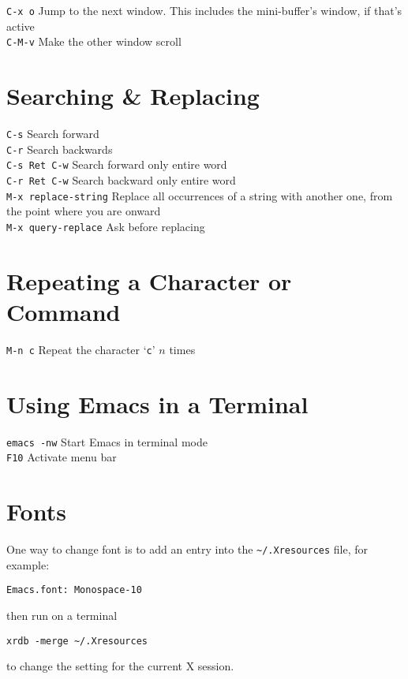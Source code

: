 \documentclass[a4paper,12pt]{report}
\begin{document}
\texttt{C-x o} Jump to the next window. This includes the mini-buffer's window, if that's active \\

\texttt{C-M-v} Make the other window scroll \\
\section{Searching \& Replacing}

\texttt{C-s} Search forward \\

\texttt{C-r} Search backwards \\

\texttt{C-s Ret C-w} Search forward only entire word \\

\texttt{C-r Ret C-w} Search backward only entire word \\

\texttt{M-x replace-string} Replace all occurrences of a string with another one, from the point where you are onward \\

\texttt{M-x query-replace} Ask before replacing \\

\section{Repeating a Character or Command}

\texttt{M-n c} Repeat the character `\texttt{c}' $n$ times\\ 

\section{Using Emacs in a Terminal}

\texttt{emacs -nw} Start Emacs in terminal mode \\

\texttt{F10} Activate menu bar \\

\section{Fonts}
One way to change font is to add an entry into the \verb+~/.Xresources+ file, for example:
\begin{verbatim}
Emacs.font: Monospace-10
\end{verbatim}
then run on a terminal
\begin{verbatim}
xrdb -merge ~/.Xresources
\end{verbatim}
to change the setting for the current X session.
\end{document}
